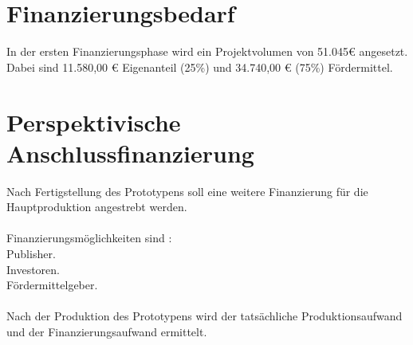 \documentclass[envcountsame,envcountchap deutsch]{i-studis}
\begin{document}
\section{Finanzierungsbedarf}
In der ersten Finanzierungsphase wird ein Projektvolumen von 51.045€ angesetzt.\\
Dabei sind 11.580,00 € Eigenanteil (25\%) und 34.740,00 € (75\%) Fördermittel.
\section{Perspektivische Anschlussfinanzierung}
Nach Fertigstellung des Prototypens soll eine weitere Finanzierung für die Hauptproduktion angestrebt werden.\\\\
Finanzierungsmöglichkeiten sind : \\
Publisher. \\
Investoren. \\
Fördermittelgeber. \\
\\
Nach der Produktion des Prototypens wird der tatsächliche Produktionsaufwand und der Finanzierungsaufwand ermittelt.

%



\begin{appendix}
\end{appendix}
\end{document}
